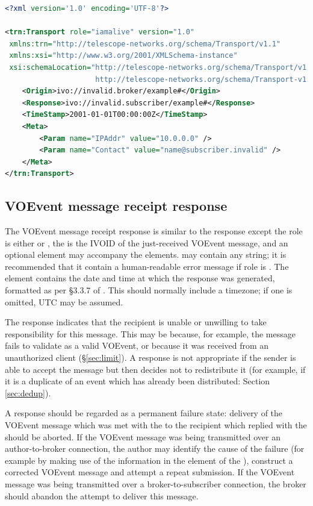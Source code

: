 \documentclass[a4paper,11pt]{ivoa}
\begin{document}
\begin{lstlisting}[language=XML,caption=Sample \xmlel{iamalive} response.,
                   label=lst:iamaliveresponse]
<?xml version='1.0' encoding='UTF-8'?>

<trn:Transport role="iamalive" version="1.0"
 xmlns:trn="http://telescope-networks.org/schema/Transport/v1.1"
 xmlns:xsi="http://www.w3.org/2001/XMLSchema-instance"
 xsi:schemaLocation="http://telescope-networks.org/schema/Transport/v1.1
                     http://telescope-networks.org/schema/Transport-v1.1.xsd">
    <Origin>ivo://invalid.broker/example#</Origin>
    <Response>ivo://invalid.subscriber/example#</Response>
    <TimeStamp>2001-01-01T00:00:00Z</TimeStamp>
    <Meta>
        <Param name="IPAddr" value="10.0.0.0" />
        <Param name="Contact" value="name@subscriber.invalid" />
    </Meta>
</trn:Transport>
\end{lstlisting}

\subsection{VOEvent message receipt response}
\label{sec:transport:ack}

The VOEvent message receipt response is similar to the 
response except the role is either  or , the
 is the IVOID of the just-received VOEvent message, and an
optional  element may accompany the 
elements.  may contain any string; it is recommended that
it contain a human-readable error message if role is . The
 element contains the date and time at which the
response was generated, formatted as per \S3.3.7 of \citet{Peterson:2012}.
This should normally include a timezone; if one is omitted, UTC may be
assumed.

The  response indicates that the recipient is unable or unwilling
to take responsibility for this message. This may be because, for example, the
message fails to validate as a valid VOEvent, or because it was received from
an unauthorized client (\S\ref{sec:limit}). A  response is not
appropriate if the sender is able to accept the message but then decides not
to redistribute it (for example, if it is a duplicate of an event which has
already been distributed: Section \ref{sec:dedup}).

A  response should be regarded as a permanent failure state:
delivery of the VOEvent message which was met with the  to the
recipient which replied with the  should be aborted. If the
VOEvent message was being transmitted over an author-to-broker connection,
the author may identify the cause of the failure (for example by making use of
the information in the  element of the ),
construct a corrected VOEvent message and attempt a repeat submission. If the
VOEvent message was being transmitted over a broker-to-subscriber connection,
the broker should abandon the attempt to deliver this message.
\end{document}
